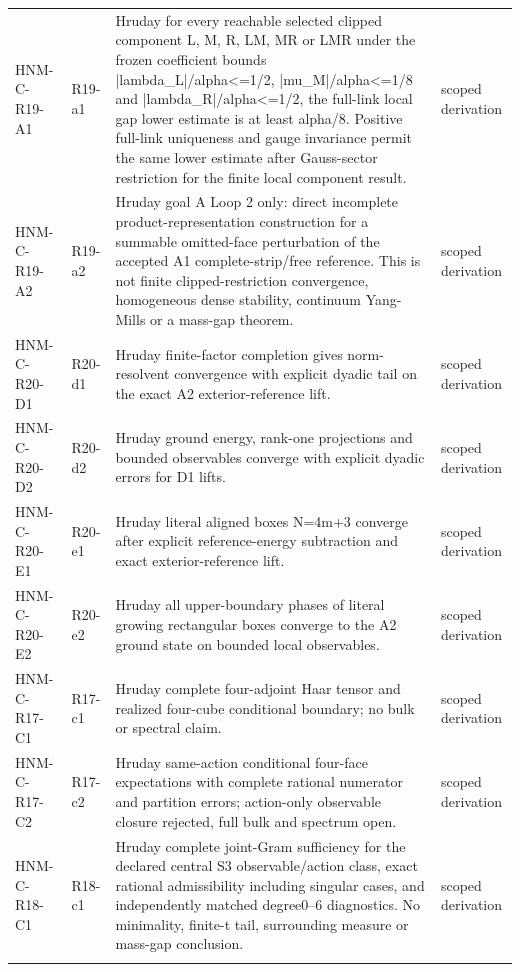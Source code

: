 \begin{longtable}{@{}p{30mm}p{26mm}p{65mm}p{27mm}@{}}
HNM-C-R19-A1 & R19-a1 & Hruday for every reachable selected clipped component L, M, R, LM, MR or LMR under the frozen coefficient bounds |lambda\_L|/alpha<=1/2, |mu\_M|/alpha<=1/8 and |lambda\_R|/alpha<=1/2, the full-link local gap lower estimate is at least alpha/8. Positive full-link uniqueness and gauge invariance permit the same lower estimate after Gauss-sector restriction for the finite local component result. & scoped derivation\\\addlinespace
HNM-C-R19-A2 & R19-a2 & Hruday goal A Loop 2 only: direct incomplete product-representation construction for a summable omitted-face perturbation of the accepted A1 complete-strip/free reference. This is not finite clipped-restriction convergence, homogeneous dense stability, continuum Yang-Mills or a mass-gap theorem. & scoped derivation\\\addlinespace
HNM-C-R20-D1 & R20-d1 & Hruday finite-factor completion gives norm-resolvent convergence with explicit dyadic tail on the exact A2 exterior-reference lift. & scoped derivation\\\addlinespace
HNM-C-R20-D2 & R20-d2 & Hruday ground energy, rank-one projections and bounded observables converge with explicit dyadic errors for D1 lifts. & scoped derivation\\\addlinespace
HNM-C-R20-E1 & R20-e1 & Hruday literal aligned boxes N=4m+3 converge after explicit reference-energy subtraction and exact exterior-reference lift. & scoped derivation\\\addlinespace
HNM-C-R20-E2 & R20-e2 & Hruday all upper-boundary phases of literal growing rectangular boxes converge to the A2 ground state on bounded local observables. & scoped derivation\\\addlinespace
HNM-C-R17-C1 & R17-c1 & Hruday complete four-adjoint Haar tensor and realized four-cube conditional boundary; no bulk or spectral claim. & scoped derivation\\\addlinespace
HNM-C-R17-C2 & R17-c2 & Hruday same-action conditional four-face expectations with complete rational numerator and partition errors; action-only observable closure rejected, full bulk and spectrum open. & scoped derivation\\\addlinespace
HNM-C-R18-C1 & R18-c1 & Hruday complete joint-Gram sufficiency for the declared central S3 observable/action class, exact rational admissibility including singular cases, and independently matched degree0--6 diagnostics. No minimality, finite-t tail, surrounding measure or mass-gap conclusion. & scoped derivation\\\addlinespace

\end{longtable}
